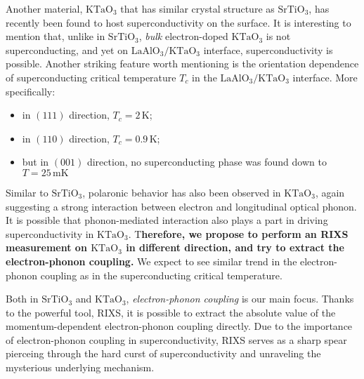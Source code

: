 \documentclass[11pt]{article}
\begin{document}
Another material, $\mathrm{KTaO_{3}}$ that has similar crystal structure as $\mathrm{SrTiO_{3}}$, has recently been found to host superconductivity on the surface\cite{ren_two-dimensional_2022}. It is interesting to mention that, unlike in $\mathrm{SrTiO_{3}}$, \textit{bulk}  electron-doped $\mathrm{KTaO_{3}}$ is not superconducting, and yet on $\mathrm{LaAlO_{3}/KTaO_{3}}$ interface, superconductivity is possible\cite{ren_two-dimensional_2022,chen_two-dimensional_2021}. Another striking feature worth mentioning is the orientation dependence of superconducting critical temperature $T_{c}$ in the $\mathrm{LaAlO_{3}/KTaO_{3}}$ interface\cite{ren_two-dimensional_2022,chen_two-dimensional_2021}. More specifically: 
\begin{itemize}
\item in $(111)$ direction, $T_{c} = 2\,\mathrm{K}$\cite{ren_two-dimensional_2022};
\item in $(110)$ direction, $T_{c} = 0.9\,\mathrm{K}$\cite{chen_two-dimensional_2021};
\item but in $(001)$ direction, no superconducting phase was found down to $T = 25\,\mathrm{mK}$\cite{ren_two-dimensional_2022} 
\end{itemize}
Similar to $\mathrm{SrTiO_{3}}$\cite{swartz_polaronic_2018}, polaronic behavior has also been observed in $\mathrm{KTaO_{3}}$, again suggesting a strong interaction between electron and longitudinal optical phonon\cite{chen_orientation-dependent_2023}. It is possible that phonon-mediated interaction also plays a part in driving superconductivity in $\mathrm{KTaO_{3}}$. T\textbf{herefore, we propose to perform an RIXS measurement on $\mathrm{KTaO_{3}}$ in different direction, and try to extract the electron-phonon coupling.}  We expect to see similar trend in the electron-phonon coupling as in the superconducting critical temperature. 

Both in $\mathrm{SrTiO_{3}}$ and $\mathrm{KTaO_{3}}$, \textit{electron-phonon coupling}  is our main focus. Thanks to the powerful tool, RIXS, it is possible to extract the absolute value of the momentum-dependent electron-phonon coupling directly. Due to the importance of electron-phonon coupling in superconductivity, RIXS serves as a sharp spear pierceing through the hard curst of superconductivity and unraveling the mysterious underlying mechanism. 
\end{document}

